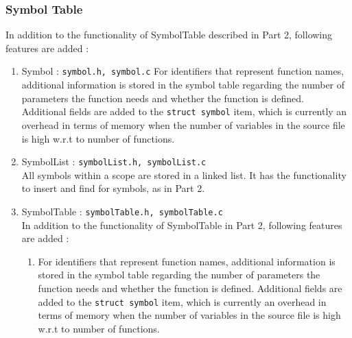 \documentclass[12pt]{article}
\begin{document}
\subsubsection{Symbol Table}
In addition to the functionality of SymbolTable described in Part 2, following features are added :
\begin{enumerate}
\item Symbol : \texttt{symbol.h, symbol.c}
For identifiers that represent function names, additional information is stored in the symbol table regarding the number of parameters the function needs and whether the function is defined. Additional fields are added to the \texttt{struct symbol} item, which is currently an overhead in terms of memory when the number of variables in the source file is high w.r.t to number of functions.


\item SymbolList : \texttt{symbolList.h, symbolList.c}
\\All symbols within a scope are stored in a linked list. It has the functionality to insert and find for symbols, as in Part 2.


\item SymbolTable : \texttt{symbolTable.h, symbolTable.c}
\\ In addition to the functionality of SymbolTable in Part 2, following features are added :
\begin{enumerate}
\item For identifiers that represent function names, additional information is stored in the symbol table regarding the number of parameters the function needs and whether the function is defined. Additional fields are added to the \texttt{struct symbol} item, which is currently an overhead in terms of memory when the number of variables in the source file is high w.r.t to number of functions.
\end{enumerate}
\end{enumerate}
\end{document}
